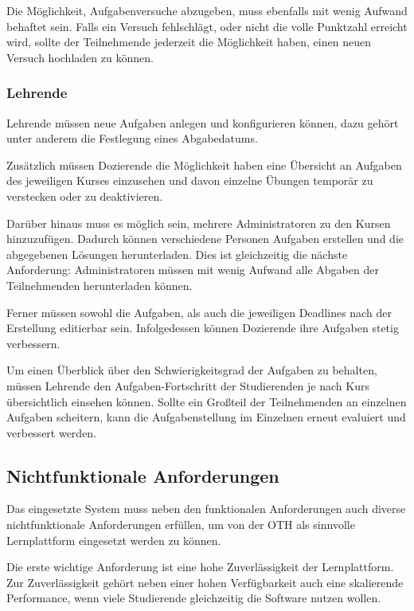 Die Möglichkeit, Aufgabenversuche abzugeben, muss ebenfalls mit wenig Aufwand
behaftet sein. Falls ein Versuch fehlschlägt, oder nicht die volle Punktzahl
erreicht wird, sollte der Teilnehmende jederzeit die Möglichkeit haben, einen
neuen Versuch hochladen zu können.

\subsubsection{Lehrende}\label{anforderungsanalyse-funktional-lehrende}
Lehrende müssen neue Aufgaben anlegen und konfigurieren können, dazu gehört
unter anderem die Festlegung eines Abgabedatums.

Zusätzlich müssen Dozierende die Möglichkeit haben eine Übersicht an Aufgaben
des jeweiligen Kurses einzusehen und davon einzelne Übungen temporär zu
verstecken oder zu deaktivieren.

Darüber hinaus muss es möglich sein, mehrere Administratoren zu den Kursen
hinzuzufügen. Dadurch können verschiedene Personen Aufgaben erstellen und die
abgegebenen Lösungen herunterladen. Dies ist gleichzeitig die nächste
Anforderung: Administratoren müssen mit wenig Aufwand alle Abgaben der
Teilnehmenden herunterladen können.

Ferner müssen sowohl die Aufgaben, als auch die jeweiligen Deadlines nach der
Erstellung editierbar sein. Infolgedessen können Dozierende ihre Aufgaben stetig
verbessern.

Um einen Überblick über den Schwierigkeitsgrad der Aufgaben zu behalten, müssen
Lehrende den Aufgaben-Fortschritt der Studierenden je nach Kurs übersichtlich
einsehen können. Sollte ein Großteil der Teilnehmenden an einzelnen Aufgaben
scheitern, kann die Aufgabenstellung im Einzelnen erneut evaluiert und
verbessert werden.

\newpage

\subsection{Nichtfunktionale Anforderungen}
\label{anforderungsanalyse-nichtfunktional}
Das eingesetzte System muss neben den funktionalen Anforderungen auch diverse
nichtfunktionale Anforderungen erfüllen, um von der OTH als sinnvolle
Lernplattform eingesetzt werden zu können.

Die erste wichtige Anforderung ist eine hohe Zuverlässigkeit der Lernplattform.
Zur Zuverlässigkeit gehört neben einer hohen Verfügbarkeit auch eine skalierende
Performance, wenn viele Studierende gleichzeitig die Software nutzen wollen.

